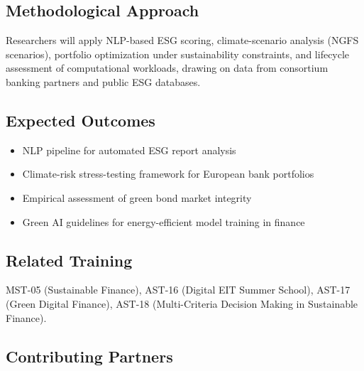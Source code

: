 \subsection*{Methodological Approach}

Researchers will apply NLP-based ESG scoring, climate-scenario analysis
(NGFS scenarios), portfolio optimization under sustainability constraints, and
lifecycle assessment of computational workloads, drawing on data from consortium
banking partners and public ESG databases.

\subsection*{Expected Outcomes}
\begin{itemize}[nosep]
  \item NLP pipeline for automated ESG report analysis
  \item Climate-risk stress-testing framework for European bank portfolios
  \item Empirical assessment of green bond market integrity
  \item Green AI guidelines for energy-efficient model training in finance
\end{itemize}

\subsection*{Related Training}
MST-05 (Sustainable Finance), AST-16 (Digital EIT Summer School),
AST-17 (Green Digital Finance),
AST-18 (Multi-Criteria Decision Making in Sustainable Finance).

\subsection*{Contributing Partners}
\begin{center}
\hspace{3mm}%
\hspace{3mm}%
\end{center}
